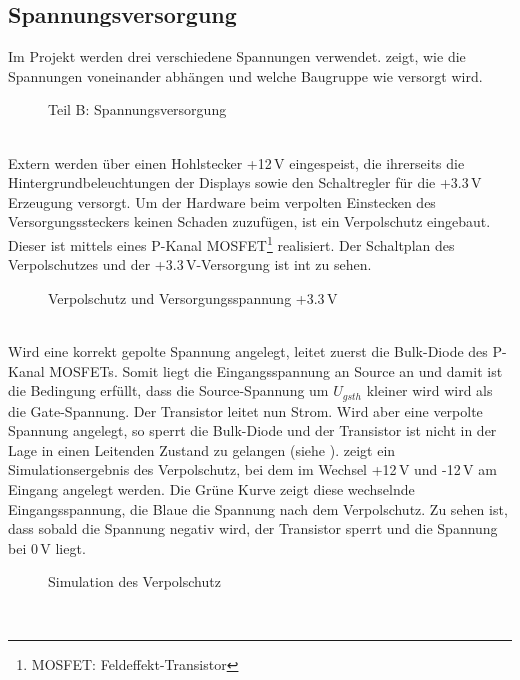 \subsection{Spannungsversorgung}
Im Projekt werden drei verschiedene Spannungen verwendet.  zeigt, wie die Spannungen voneinander abhängen und welche Baugruppe wie versorgt wird. 
\begin{figure}[htp]
	\center
    \caption{Teil B: Spannungsversorgung}
    \label{fig:teilb_supply}
\end{figure}\\
Extern werden über einen Hohlstecker +12\,V eingespeist, die ihrerseits die Hintergrundbeleuchtungen der Displays sowie den Schaltregler für die +3.3\,V Erzeugung versorgt. Um der Hardware beim verpolten Einstecken des Versorgungssteckers keinen Schaden zuzufügen, ist ein Verpolschutz eingebaut. Dieser ist mittels eines P-Kanal MOSFET\footnote{MOSFET: Feldeffekt-Transistor}  realisiert. Der Schaltplan des Verpolschutzes und der +3.3\,V-Versorgung ist int  zu sehen.
\begin{figure}[htp]
	\center
    \caption{Verpolschutz und Versorgungsspannung +3.3\,V}
    \label{fig:3_3_supply}
\end{figure}\\
Wird eine korrekt gepolte Spannung angelegt, leitet zuerst die Bulk-Diode des P-Kanal MOSFETs. Somit liegt die Eingangsspannung an Source an und damit ist die Bedingung erfüllt, dass die Source-Spannung um $U_{gsth}$ kleiner wird wird als die Gate-Spannung. Der Transistor leitet nun Strom. Wird aber eine verpolte Spannung angelegt, so sperrt die Bulk-Diode und der Transistor ist nicht in der Lage in einen Leitenden Zustand zu gelangen (siehe \cite{Miller2010}).  zeigt ein Simulationsergebnis des Verpolschutz, bei dem im Wechsel +12\,V und -12\,V am Eingang angelegt werden. Die Grüne Kurve zeigt diese wechselnde Eingangsspannung, die Blaue die Spannung nach dem Verpolschutz. Zu sehen ist, dass sobald die Spannung negativ wird, der Transistor sperrt und die Spannung bei 0\,V liegt.
\begin{figure}[htp]
	\center
    \caption{Simulation des Verpolschutz}
    \label{fig:verpolschutz_sim}
\end{figure}\\

